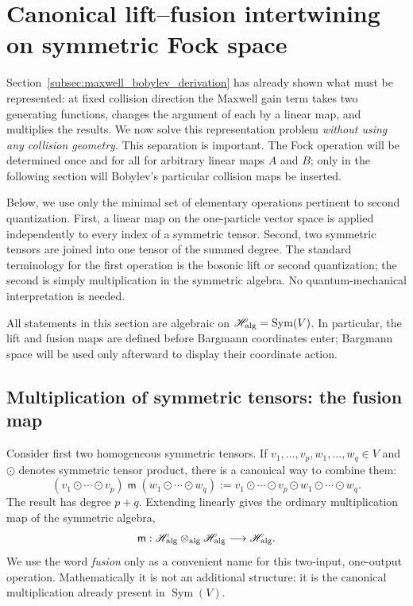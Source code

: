 \documentclass[11pt,oneside]{article}
\numberwithin{equation}{section}
\theoremstyle{definition}
\begin{document}
\section{Canonical lift--fusion intertwining on symmetric Fock space}
\label{subsec:maxwell_lift_fusion_theorem}

Section~\ref{subsec:maxwell_bobylev_derivation} has already shown what must be represented: at fixed collision direction the Maxwell gain term takes two generating functions, changes the argument of each by a linear map, and multiplies the results.  We now solve this representation problem \emph{without using any collision geometry}.  This separation is important.  The Fock operation will be determined once and for all for arbitrary linear maps $A$ and $B$; only in the following section will Bobylev's particular collision maps be inserted.


Below, we use only the minimal set of elementary operations pertinent to second quantization.  First, a linear map on the one-particle vector space is applied independently to every index of a symmetric tensor.  Second, two symmetric tensors are joined into one tensor of the summed degree.  The standard terminology for the first operation is the bosonic lift or second quantization; the second is simply multiplication in the symmetric algebra.  No quantum-mechanical interpretation is needed.

All statements in this section are algebraic on $\mathscr H_{\rm alg}=\operatorname{Sym}(V)$.  In particular, the lift and fusion maps are defined before Bargmann coordinates enter; Bargmann space will be used only afterward to display their coordinate action.

\subsection{Multiplication of symmetric tensors: the fusion map}
\label{subsec:maxwell_fusion_explained}

Consider first two homogeneous symmetric tensors.  If $v_1,\ldots,v_p,w_1,\ldots,w_q\in V$ and $\odot$ denotes symmetric tensor product, there is a canonical way to combine them:
\begin{equation}
(v_1\odot\cdots\odot v_p)
\;\mathsf m\;
(w_1\odot\cdots\odot w_q)
:=
v_1\odot\cdots\odot v_p\odot
w_1\odot\cdots\odot w_q.
\label{eq:maxwell_fusion_elementary_tensor}
\end{equation}
The result has degree $p+q$.  Extending linearly gives the ordinary multiplication map of the symmetric algebra,
\begin{equation}
\mathsf m:
\mathscr H_{\rm alg}\otimes_{\rm alg}\mathscr H_{\rm alg}
\longrightarrow
\mathscr H_{\rm alg}.
\label{eq:maxwell_fusion_intrinsic}
\end{equation}
We use the word \emph{fusion} only as a convenient name for this two-input, one-output operation.  Mathematically it is not an additional structure: it is the canonical multiplication already present in $\operatorname{Sym}(V)$.
\end{document}
